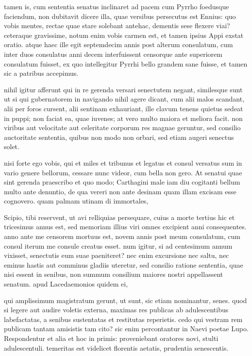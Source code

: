  tamen is, cum sententia senatus inclinaret ad pacem cum Pyrrho foedusque faciendum, non dubitavit dicere illa, quae versibus persecutus est Ennius: quo vobis mentes, rectae quae stare solebant antehac, dementis sese flexere viai? ceteraque gravissime, notum enim vobis carmen est, et tamen ipsius Appi exstat oratio. atque haec ille egit septemdecim annis post alterum consulatum, cum inter duos consulatus anni decem interfuissent censorque ante superiorem consulatum fuisset, ex quo intellegitur Pyrrhi bello grandem sane fuisse, et tamen sic a patribus accepimus.

 nihil igitur afferunt qui in re gerenda versari senectutem negant, similesque sunt ut si qui gubernatorem in navigando nihil agere dicant, cum alii malos scandant, alii per foros cursent, alii sentinam exhauriant, ille clavum tenens quietus sedeat in puppi; non faciat ea, quae iuvenes; at vero multo maiora et meliora facit. non viribus aut velocitate aut celeritate corporum res magnae geruntur, sed consilio auctoritate sententia, quibus non modo non orbari, sed etiam augeri senectus solet.

 nisi forte ego vobis, qui et miles et tribunus et legatus et consul versatus sum in vario genere bellorum, cessare nunc videor, cum bella non gero. At senatui quae sint gerenda praescribo et quo modo; Carthagini male iam diu cogitanti bellum multo ante denuntio, de qua vereri non ante desinam quam illam excisam esse cognovero. quam palmam utinam di immortales,

 Scipio, tibi reservent, ut avi relliquias persequare, cuius a morte tertius hic et tricesimus annus est, sed memoriam illius viri omnes excipient anni consequentes. anno ante me censorem mortuus est, novem annis post meum consulatum, cum consul iterum me consule creatus esset. num igitur, si ad centesimum annum vixisset, senectutis eum suae paeniteret? nec enim excursione nec saltu, nec eminus hastis aut comminus gladiis uteretur, sed consilio ratione sententia, quae nisi essent in senibus, non summum consilium maiores nostri appellassent senatum. apud Lacedaemonios quidem ei,

 qui amplissimum magistratum gerunt, ut sunt, sic etiam nominantur, senes. quod si legere aut audire voletis externa, maximas res publicas ab adulescentibus labefactatas, a senibus sustentatas et restitutas reperietis. cedo qui vestram rem publicam tantam amisistis tam cito? sic enim percontantur in Naevi poetae Lupo. Respondentur et alia et hoc in primis: proveniebant oratores novi, stulti adulescentuli. temeritas est videlicet florentis aetatis, prudentia senescentis.

